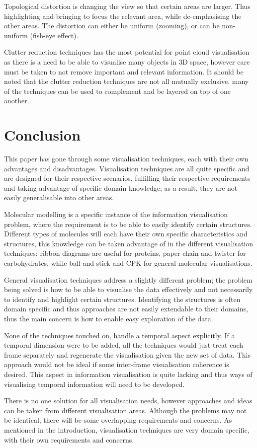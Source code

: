 \documentclass[a4paper]{article}
\begin{document}
Topological distortion is changing the view so that certain areas are larger.
Thus highlighting and bringing to focus the relevant area, while de-emphasising
the other areas. The distortion can either be uniform (zooming), or can be
non-uniform (fish-eye effect).

Clutter reduction techniques has the most potential for point cloud
visualisation as there is a need to be able to visualise many objects in 3D
space, however care must be taken to not remove important and relevant
information. It should be noted that the clutter reduction techniques are not
all mutually exclusive, many of the techniques can be used to complement and be
layered on top of one another.


\section{Conclusion}
This paper has gone through some visualisation techniques, each with their own
advantages and disadvantages. Visualisation techniques are all quite specific
and are designed for their respective scenarios, fulfilling their respective
requirements and taking advantage of specific domain knowledge; as a result,
they are not easily generalisable into other areas.

Molecular modelling is a specific instance of the information visualisation
problem, where the requirement is to be able to easily identify certain
structures. Different types of molecules will each have their own specific
characteristics and structures, this knowledge can be taken advantage of in the
different visualisation techniques: ribbon diagrams are useful for proteins,
paper chain and twister for carbohydrates, while ball-and-stick and CPK for
general molecular visualisations.

General visualisation techniques address a slightly different problem; the
problem being solved is how to be able to visualise the data effectively and
not necessarily to identify and highlight certain structures. Identifying the
structures is often domain specific and thus approaches are not easily
extendable to their domains, thus the main concern is how to enable easy
exploration of the data.

None of the techniques touched on, handle a temporal aspect explicitly. If a
temporal dimension were to be added, all the techniques would just treat each
frame separately and regenerate the visualisation given the new set of data.
This approach would not be ideal if some inter-frame visualisation coherence is
desired. This aspect in information visualisation is quite lacking and thus ways
of visualising temporal information will need to be developed.

There is no one solution for all visualisation needs, however approaches and
ideas can be taken from different visualisation areas. Although the problems
may not be identical, there will be some overlapping requirements and concerns.
As mentioned in the introduction, visualisation techniques are very domain
specific, with their own requirements and concerns.



\end{document}
